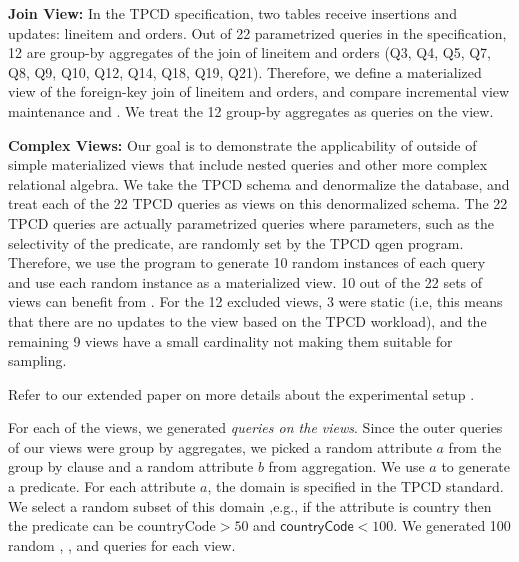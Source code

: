 \textbf{Join View:} In the TPCD specification, two tables receive insertions and updates: \textsf{lineitem} and \textsf{orders}.
Out of 22 parametrized queries in the specification, 12 are group-by aggregates of the join of \textsf{lineitem} and \textsf{orders} (Q3, Q4, Q5, Q7, Q8, Q9, Q10, Q12, Q14, Q18, Q19, Q21).
Therefore, we define a materialized view of the foreign-key join of \textsf{lineitem} and \textsf{orders}, and compare incremental view maintenance and \svc.
We treat the 12 group-by aggregates as queries on the view.


\textbf{Complex Views:} Our goal is to demonstrate the applicability of \svc outside of simple materialized views that include nested queries and other more complex relational algebra.
We take the TPCD schema and denormalize the database, and treat each of the 22 
TPCD queries as views on this denormalized schema. 
The 22 TPCD queries are actually parametrized queries where parameters, such as the selectivity of the predicate, are randomly set by the TPCD \textsf{qgen} program.
Therefore, we use the program to generate 10 random instances of each query and use each random instance as a materialized view.
10 out of the 22 sets of views can benefit from \svc.
For the 12 excluded views, 3 were static (i.e, this means that there are no updates to the view based on the TPCD workload), and the remaining 9 views have a small cardinality not making them suitable for sampling.

Refer to our extended paper on more details about the experimental setup \cite{technicalReport}.

For each of the views, we generated \emph{queries on the views}.
Since the outer queries of our views were group by aggregates, we picked a random attribute $a$ from the group by clause and a random attribute $b$ from aggregation.
We use $a$ to generate a predicate.
For each attribute $a$, the domain is specified in the TPCD standard.
We select a random subset of this domain ,e.g., if the attribute is country then the predicate can be $\text{countryCode} > 50$ and $\textsf{countryCode} < 100$.
We generated 100 random \sumfunc, \avgfunc, and \countfunc queries for each view.

